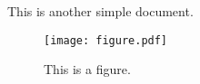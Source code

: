 \documentclass{article}
\begin{document}
This is another simple document.

\begin{figure}[htbp]
    \centering
    \texttt{[image: figure.pdf]}
    \caption{This is a figure.}
    \label{fig:a-figure}
\end{figure}
\end{document}
